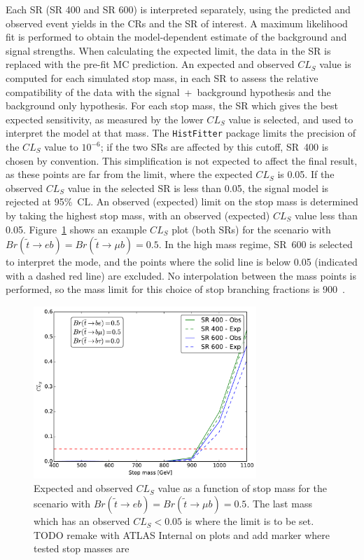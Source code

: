 Each SR (SR 400 and SR 600) is interpreted separately, using the predicted and
observed event yields in the CRs and the SR of interest.
A maximum likelihood fit is performed to obtain the model-dependent estimate of
the background and signal strengths.
When calculating the expected limit, the data in the SR is replaced with the
pre-fit MC prediction.
An expected and observed $CL_S$ value is computed for each simulated stop mass,
in each SR to assess the relative compatibility of the data with the
signal~+~background hypothesis and the background only hypothesis.
For each stop mass, the SR which gives the best expected sensitivity, as
measured by the lower $CL_S$ value is selected, and used to interpret the model
at that mass.
The \texttt{HistFitter} package limits the precision of the $CL_S$ value
to $10^{-6}$; if the two SRs are affected by this cutoff, SR~400 is chosen by
convention.
This simplification is not expected to affect the final result, as these points
are far from the limit, where the expected $CL_S$ is 0.05.
If the observed $CL_S$ value in the selected SR is less than 0.05, the signal
model is rejected at 95\%~CL.
An observed (expected) limit on the stop mass is determined by taking the
highest stop mass, with an observed (expected) $CL_S$ value less than 0.05.
Figure~\ref{fig:exp_limit_br_5050} shows an example $CL_S$ plot (both SRs)
for the scenario with $Br(\tilde{t} \to eb) = Br(\tilde{t} \to \mu b) = 0.5$.
In the high mass regime, SR~600 is selected to interpret the mode, and
the points where the solid line is below 0.05 (indicated with a dashed red line)
are excluded.
No interpolation between the mass points is performed, so the mass limit for
this choice of stop branching fractions is 900~\GeV.

\begin{figure}[t]
  \centering
  \includegraphics[width=0.75\textwidth]{figs/blstop/cls_plots/cls_vs_m_br_e_50_br_m_50_br_t_0.pdf}
  \caption{Expected and observed $CL_S$ value as a function of stop mass for
    the scenario with $Br(\tilde{t} \to eb) = Br(\tilde{t} \to \mu b) = 0.5$.
    The last mass which has an observed $CL_S < 0.05$ is where the limit is to
    be set.
    {\color{red} TODO remake with ATLAS Internal on plots and add marker where
    tested stop masses are}
  }
  \label{fig:exp_limit_br_5050}
\end{figure}

